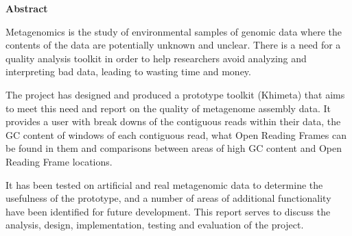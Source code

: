 \thispagestyle{empty}

\begin{center}
    {\LARGE\bf Abstract}
\end{center}

Metagenomics is the study of environmental samples of genomic data where the contents of the data are potentially unknown and unclear. There is a need for a quality analysis toolkit in order to help researchers avoid analyzing and interpreting bad data, leading to  wasting time and money.

The project has designed and produced a prototype toolkit (Khimeta) that aims to meet this need and report on the quality of metagenome assembly data. It provides a user with break downs of the contiguous reads within their data, the GC content of windows of each contiguous read, what Open Reading Frames can be found in them and comparisons between areas of high GC content and Open Reading Frame locations.

It has been tested on artificial and real metagenomic data to determine the usefulness of the prototype, and a number of areas of additional functionality have been identified for future development. This report serves to discuss the analysis, design, implementation, testing and evaluation of the project.
